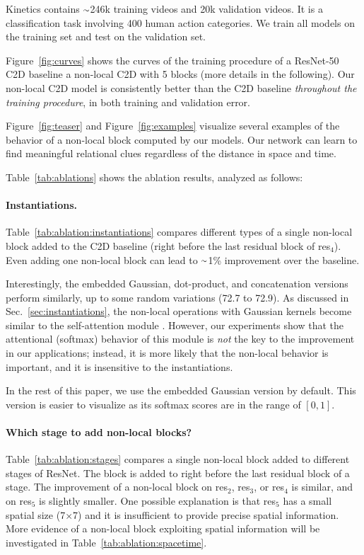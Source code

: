 \documentclass[10pt,twocolumn,letterpaper]{article}
\newcommand{\app}{\raise.17ex\hbox{$\scriptstyle\sim$}}
\def\x{$\times$}
\begin{document}
Kinetics \cite{Kay2017} contains $\app$246k training videos and 20k validation videos. It is a classification task involving 400 human action categories. We train all models on the training set and test on the validation set.

Figure~\ref{fig:curves} shows the curves of the training procedure of a ResNet-50 C2D baseline \vs a non-local C2D with 5 blocks (more details in the following). Our non-local C2D model is consistently better than the C2D baseline \emph{throughout the training procedure}, in both training and validation error.

Figure~\ref{fig:teaser} and Figure~\ref{fig:examples} visualize several examples of the behavior of a non-local block computed by our models. Our network can learn to find meaningful relational clues regardless of the distance in space and time.

Table~\ref{tab:ablations} shows the ablation results, analyzed as follows:

\paragraph{Instantiations.} Table~\ref{tab:ablation:instantiations} compares different types of a single non-local block added to the C2D baseline (right before the last residual block of res$_4$). Even adding one non-local block can lead to  $\app$1\% improvement over the baseline.

Interestingly, the embedded Gaussian, dot-product, and concatenation versions perform similarly, up to some random variations (72.7 to 72.9). As discussed in Sec.~\ref{sec:instantiations}, the non-local operations with Gaussian kernels become similar to the self-attention module \cite{Vaswani2017}. However, our experiments show that the attentional (softmax) behavior of this module is \emph{not} the key to the improvement in our applications; instead, it is more likely that the non-local behavior is important, and it is insensitive to the instantiations.

In the rest of this paper, we use the embedded Gaussian version by default. This version is easier to visualize as its softmax scores are in the range of $[0, 1]$.

\paragraph{Which stage to add non-local blocks?} Table~\ref{tab:ablation:stages} compares a single non-local block added to different stages of ResNet. The block is added to right before the last residual block of a stage. The improvement of a non-local block on res$_2$, res$_3$, or res$_4$ is similar, and on res$_5$ is slightly smaller. One possible explanation is that res$_5$ has a small spatial size (7\x7) and it is insufficient to provide precise spatial information. More evidence of a non-local block exploiting spatial information will be investigated in Table~\ref{tab:ablation:spacetime}.
\end{document}
